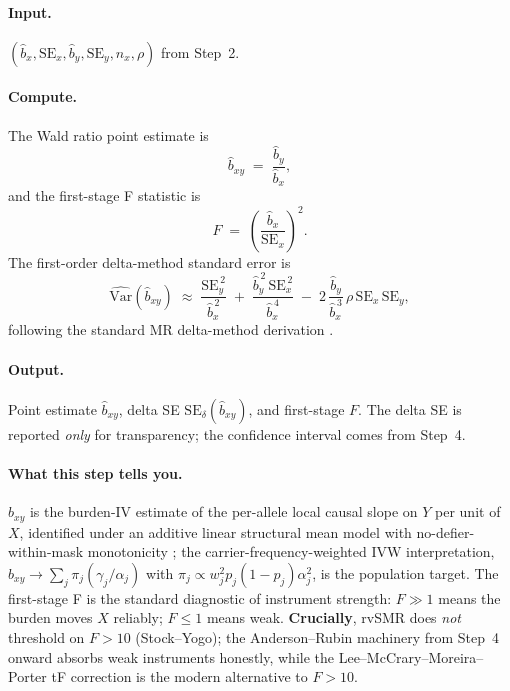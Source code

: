 \documentclass[11pt]{article}
\begin{document}
\paragraph{Input.} $(\hat b_x, \mathrm{SE}_x, \hat b_y, \mathrm{SE}_y, n_x, \rho)$ from Step~2.

\paragraph{Compute.} The Wald ratio point estimate is
\begin{equation}
\hat b_{xy} \;=\; \frac{\hat b_y}{\hat b_x},
\label{eq:wald}
\end{equation}
and the first-stage F statistic is
\begin{equation}
F \;=\; \left(\frac{\hat b_x}{\mathrm{SE}_x}\right)^2.
\label{eq:Fstat}
\end{equation}
The first-order delta-method standard error is
\begin{equation}
\widehat{\mathrm{Var}}(\hat b_{xy}) \;\approx\; \frac{\mathrm{SE}_y^{\,2}}{\hat b_x^{\,2}} \;+\; \frac{\hat b_y^{\,2}\,\mathrm{SE}_x^{\,2}}{\hat b_x^{\,4}} \;-\; 2\,\frac{\hat b_y}{\hat b_x^{\,3}}\,\rho\,\mathrm{SE}_x\,\mathrm{SE}_y,
\label{eq:delta-se}
\end{equation}
following the standard MR delta-method derivation \citep{BurgessLabrecque2018,DidelezSheehan2007}.

\paragraph{Output.} Point estimate $\hat b_{xy}$, delta SE $\mathrm{SE}_\delta(\hat b_{xy})$, and first-stage $F$. The delta SE is reported \emph{only} for transparency; the confidence interval comes from Step~4.

\paragraph{What this step tells you.} $\hat b_{xy}$ is the burden-IV estimate of the per-allele local causal slope on $Y$ per unit of $X$, identified under an additive linear structural mean model with no-defier-within-mask monotonicity \citep{Robins1994,ImbensAngrist1994}; the carrier-frequency-weighted IVW interpretation, $\hat b_{xy}\to\sum_j\pi_j(\gamma_j/\alpha_j)$ with $\pi_j\propto w_j^2 p_j(1-p_j)\alpha_j^2$, is the population target. The first-stage F is the standard diagnostic of instrument strength: $F\gg 1$ means the burden moves $X$ reliably; $F\le 1$ means weak. \textbf{Crucially}, rvSMR does \emph{not} threshold on $F>10$ (Stock--Yogo); the Anderson--Rubin machinery from Step~4 onward absorbs weak instruments honestly, while the Lee--McCrary--Moreira--Porter tF correction \citep{LeeMcCraryMoreiraPorter2022} is the modern alternative to $F>10$.
\end{document}
